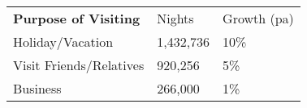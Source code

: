 \begin{tabular}[t]{p{4.8cm}>{\hfill}p{1.3cm}>{\hfill}p{1.4cm}}
 \textbf{Purpose of Visiting} & Nights & Growth (pa) \\ 
 Holiday/Vacation & 1,432,736 & 10\% \\ 
  Visit Friends/Relatives &   920,256 & 5\% \\ 
  Business &   266,000 & 1\% \\ 
  \end{tabular}
